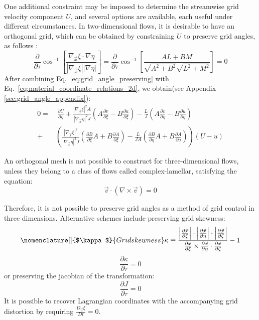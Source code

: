 \documentclass[12pt,letterpaper]{article}
\begin{document}
One additional constraint may be imposed to determine the streamwise
grid velocity component $U$, and several options are available, each
useful under different circumstances. In two-dimensional flows, it is
desirable to have an orthogonal grid, which can be obtained by
constraining $U$ to preserve grid angles, as follows \cite{hui07}:
\begin{equation}
\label{eq:grid_angle_preserving}
\frac{\partial}{\partial \tau}\cos^{-1}\left[ 
\frac{\nabla_{\vec{x}} \xi \cdot \nabla \eta}
{\left|\nabla_{\vec{x}} \xi\right|\left|\nabla \eta\right|} 
\right]
=
\frac{\partial}{\partial \tau} \cos^{-1}\left[
\frac{AL+BM}{\sqrt{A^2+B^2}\sqrt{L^2+M^2}}
\right]
=0
\end{equation}
After combining Eq.~\ref{eq:grid_angle_preserving} with
Eq.~\ref{eq:material_coordinate_relations_2d}, we obtain(see Appendix
\ref{sec:grid_angle_appendix}):
\begin{align}
\label{eq:grid_angle_preserving_ODE}
0=&~\frac{\partial U}{\partial \eta }
+\frac{\left|\nabla_{\vec{x}}\xi\right|^2A}
{\left|\nabla_{\vec{x}}\eta\right|^2J}\left(A\frac{\partial
    v}{\partial \xi}-B\frac{\partial u}{\partial \xi}\right)
-\frac{L}{J}\left(A\frac{\partial v}{\partial \eta}-B\frac{\partial
    u}{\partial \eta}\right)\\
+&\left(\frac{\left|\nabla_{\vec{x}}\xi\right|^2}{\left|\nabla_{\vec{x}}\eta\right|^2J}
\left(\frac{\partial B}{\partial \xi}
    A+B\frac{\partial A}{\partial
      \xi}\right)-\frac{L}{JA}\left(\frac{\partial B}{\partial \eta}
    A+B\frac{\partial A}{\partial \eta}\right)\right)\left(U-u\right)
\end{align}

An orthogonal mesh is not possible to construct for three-dimensional
flows, unless they belong to a class of flows called
complex-lamellar, satisfying the equation:
\begin{equation}
\vec{v}\cdot\left(\nabla\times\vec{v}\right)=0
\end{equation}

Therefore, it is not possible to preserve grid angles as a method of
grid control in three dimensions. Alternative schemes include
preserving grid skewness:
\begin{equation}
\nomenclature[]{$\kappa$}{Grid skewness}
\kappa\equiv\frac{\left|\frac{\partial \vec{x}}{\partial
\xi}\right|\cdot\left|\frac{\partial \vec{x}}{\partial
\eta}\right|\cdot\left|\frac{\partial \vec{x}}{\partial
\zeta}\right|}{
\frac{\partial \vec{x}}{\partial \xi} \times
\frac{\partial \vec{x}}{\partial
\eta}\cdot \frac{\partial \vec{x}}{\partial \zeta}
}-1
\end{equation}
\begin{equation}
\frac{\partial \kappa}{\partial \tau}=0
\end{equation}
\noindent or preserving the jacobian of the transformation:
\begin{equation}
\frac{\partial J}{\partial \tau} = 0
\end{equation}
It is possible to recover Lagrangian coordinates with the accompanying
grid distortion by requiring $\frac{D_{\vec{u}}\xi}{Dt}=0$.
\end{document}
